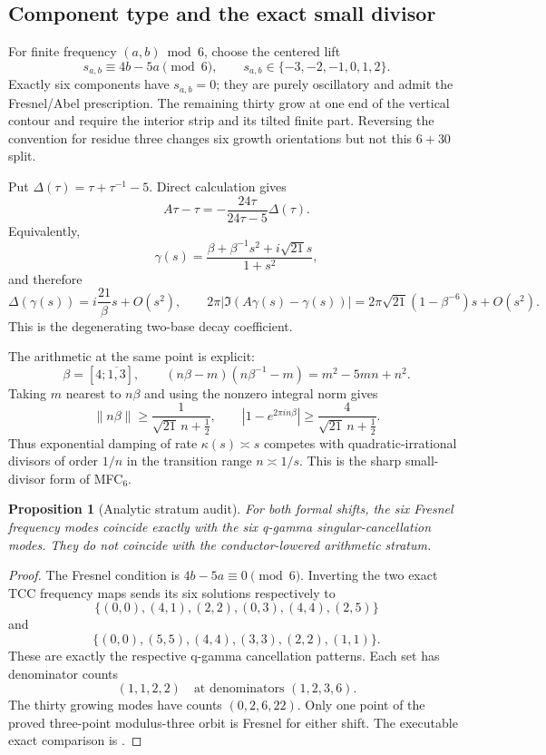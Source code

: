 \documentclass[11pt]{article}
\newtheorem{proposition}[theorem]{Proposition}
\begin{document}
\subsection*{Component type and the exact small divisor}

For finite frequency $(a,b)\bmod6$, choose the centered lift
\[
 s_{a,b}\equiv4b-5a\pmod6,\qquad
 s_{a,b}\in\{-3,-2,-1,0,1,2\}.
\]
Exactly six components have $s_{a,b}=0$; they are purely oscillatory
and admit the Fresnel/Abel prescription.  The remaining thirty grow at
one end of the vertical contour and require the interior strip and its
tilted finite part.  Reversing the convention for residue three changes
six growth orientations but not this $6+30$ split.

Put $\Delta(\tau)=\tau+\tau^{-1}-5$.  Direct calculation gives
\[
 A\tau-\tau
 =-\frac{24\tau}{24\tau-5}\Delta(\tau).
\tag{19a}
\]
Equivalently,
\[
 \gamma(s)=
 \frac{\beta+\beta^{-1}s^2+i\sqrt{21}s}{1+s^2},
\]
and therefore
\[
 \Delta(\gamma(s))
 =i\frac{21}{\beta}s+O(s^2),
\qquad
 2\pi|\Im(A\gamma(s)-\gamma(s))|
 =2\pi\sqrt{21}(1-\beta^{-6})s+O(s^2).
\tag{19b}
\]
This is the degenerating two-base decay coefficient.

The arithmetic at the same point is explicit:
\[
 \beta=[4;\overline{1,3}],\qquad
 (n\beta-m)(n\beta^{-1}-m)=m^2-5mn+n^2.
\]
Taking $m$ nearest to $n\beta$ and using the nonzero integral norm gives
\[
 \|n\beta\|\geq\frac1{\sqrt{21}\,n+\tfrac12},
\qquad
 |1-e^{2\pi in\beta}|
 \geq\frac4{\sqrt{21}\,n+\tfrac12}.
\tag{19c}
\]
Thus exponential damping of rate $\kappa(s)\asymp s$ competes with
quadratic-irrational divisors of order $1/n$ in the transition range
$n\asymp1/s$.  This is the sharp small-divisor form of MFC$_6$.

\begin{proposition}[Analytic stratum audit]\label{prop:stratum}
For both formal shifts, the six Fresnel frequency modes coincide
exactly with the six q-gamma singular-cancellation modes.  They do not
coincide with the conductor-lowered arithmetic stratum.
\end{proposition}

\begin{proof}
The Fresnel condition is $4b-5a\equiv0\pmod6$.  Inverting the two exact
TCC frequency maps sends its six solutions respectively to
\[
 \{(0,0),(4,1),(2,2),(0,3),(4,4),(2,5)\}
\]
and
\[
 \{(0,0),(5,5),(4,4),(3,3),(2,2),(1,1)\}.
\]
These are exactly the respective q-gamma cancellation patterns.  Each
set has denominator counts
\[
 (1,1,2,2)\quad\text{at denominators }(1,2,3,6).
\]
The thirty growing modes have counts $(0,2,6,22)$.  Only one point of
the proved three-point modulus-three orbit is Fresnel for either
shift.  The executable exact comparison is
.
\end{proof}
\end{document}
